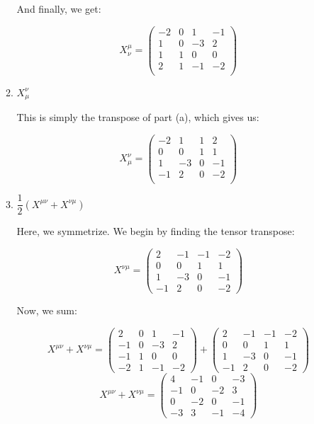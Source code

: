 \begin{enumerate}
\begin{enumerate}
        And finally, we get:

        $$\boxed{X_{\nu}^{\mu}=\left( \begin{matrix} -2 & 0 & 1 & -1 \\ 1 & 0 & -3 & 2\\ 1 & 1 & 0 & 0\\ 2 & 1 & -1 & -2\\ \end{matrix}\right)}$$

      \item $X^{\nu}_{\mu}$

        This is simply the transpose of part (a), which gives us:

        $$\boxed{X_{\mu}^{\nu}=\left( \begin{matrix} -2 & 1 & 1 & 2 \\ 0 & 0 & 1 & 1\\ 1 & -3 & 0 & -1\\ -1 & 2 & 0 & -2\\ \end{matrix}\right)}$$

      \item $\dfrac{1}{2}\left( X^{\mu\nu}+X^{\nu\mu} \right)$

        Here, we symmetrize. We begin by finding the tensor transpose:

        $$X^{\nu\mu}=\left( \begin{matrix} 2 & -1 & -1 & -2\\ 0 & 0 & 1 & 1 \\ 1 & -3 & 0 & -1\\ -1 & 2 & 0 & -2\end{matrix} \right)$$

        Now, we sum:

        $$X^{\mu\nu}+X^{\nu\mu}=\left( \begin{matrix} 2 & 0 & 1 & -1 \\ -1 & 0 & -3 & 2\\ -1 & 1 & 0 & 0\\ -2 & 1 & -1 & -2\end{matrix} \right)+\left( \begin{matrix} 2 & -1 & -1 & -2\\ 0 & 0 & 1 & 1 \\ 1 & -3 & 0 & -1\\ -1 & 2 & 0 & -2\end{matrix} \right)$$
        $$X^{\mu\nu}+X^{\nu\mu}=\left( \begin{matrix} 4 & -1 & 0 & -3\\ -1 & 0 & -2 & 3\\ 0 & -2 & 0 & -1\\ -3 & 3 & -1 & -4 \end{matrix}\right)$$


\end{enumerate}
\end{enumerate}
